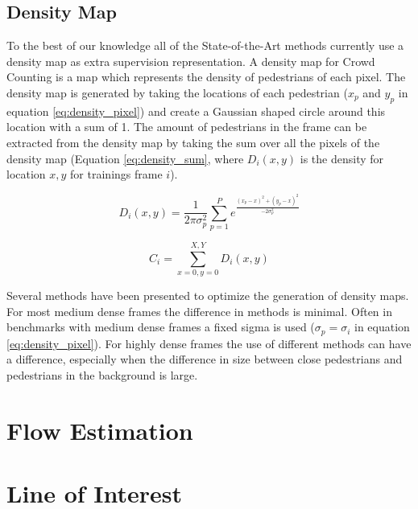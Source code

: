 \subsection{Density Map}
To the best of our knowledge all of the State-of-the-Art methods currently use a density map as extra supervision representation. A density map for Crowd Counting is a map which represents the density of pedestrians of each pixel. The density map is generated by taking the locations of each pedestrian ($x_p$ and $y_p$ in equation \ref{eq:density_pixel}) and create a Gaussian shaped circle around this location with a sum of 1. The amount of pedestrians in the frame can be extracted from the density map by taking the sum over all the pixels of the density map (Equation \ref{eq:density_sum}, where $D_i(x,y)$ is the density for location $x,y$ for trainings frame $i$).

\begin{equation}
\label{eq:density_pixel}
	D_i(x,y) = \frac{1}{2 \pi \sigma_p^2}\sum^P_{p=1} e^{\frac{(x_p-x)^2+(y_p-x)^2}{-2 \sigma_p^2}}
\end{equation}

\begin{equation}
	\label{eq:density_sum}
	C_i = \sum_{x=0,y=0}^{X,Y} D_i(x,y)
\end{equation}

Several methods have been presented to optimize the generation of density maps. For most medium dense frames the difference in methods is minimal. Often in benchmarks with medium dense frames a fixed sigma is used ($\sigma_p=\sigma_i$ in equation \ref{eq:density_pixel}). For highly dense frames the use of different methods can have a difference, especially when the difference in size between close pedestrians and pedestrians in the background is large.

\section{Flow Estimation}


\section{Line of Interest}
